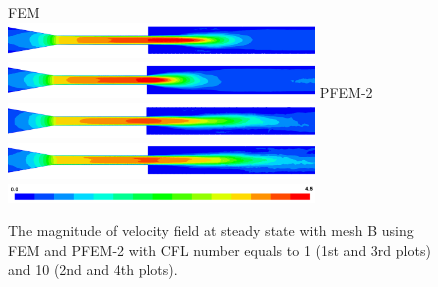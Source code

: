 \begin{figure}[htbp]
    \centering
    FEM\\
    \includegraphics[width=3.2in]{imgs/nozzle_pump/nozzle_fem_pm_cfl1.png}
    \includegraphics[width=3.2in]{imgs/nozzle_pump/nozzle_fem_pm_cfl10.png}
    PFEM-2\\
    \includegraphics[width=3.2in]{imgs/nozzle_pump/nozzle_pfem_pm_cfl1.png}
    \includegraphics[width=3.2in]{imgs/nozzle_pump/nozzle_pfem_pm_cfl10.png}
    \includegraphics[width=3.2in]{imgs/nozzle_pump/nozzle_legend.png}
    \caption{The magnitude of velocity field at steady state with mesh B using FEM and PFEM-2 with CFL number equals to 1 (1st and 3rd plots) and 10 (2nd and 4th plots).}
    \label{fig:nozzlevelpm}
\end{figure}


